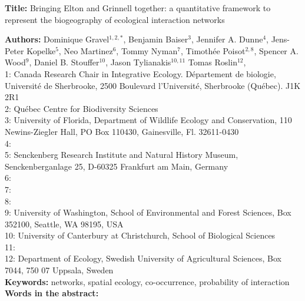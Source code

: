 \documentclass[12pt]{article}
\begin{document}
\linenumbers 
\modulolinenumbers[1]

\textbf{Title:} Bringing Elton and Grinnell together: a quantitative framework to represent the biogeography of ecological interaction networks

\textbf{Authors:} Dominique Gravel$^{1,2,*}$, Benjamin Baiser$^{3}$, Jennifer A. Dunne$^{4}$, Jens-Peter Kopelke$^{5}$, Neo
Martinez$^{6}$, Tommy Nyman$^{7}$, Timoth\'ee Poisot$^{2,8}$,  Spencer A. Wood$^{9}$, Daniel B. Stouffer$^{10}$, Jason Tylianakis$^{10,11}$ Tomas Roslin$^{12}$,\\

1: Canada Research Chair in Integrative Ecology. D\'epartement de
biologie, Universit\'e de Sherbrooke,  2500 Boulevard l'Universit\'e, 
Sherbrooke (Québec).  J1K 2R1\\

2: Qu\'ebec Centre for Biodiversity Sciences\\

3: University of Florida, Department of Wildlife Ecology and Conservation, 110 Newins-Ziegler Hall, PO Box 110430, Gainesville, Fl. 32611-0430 \\

4: \\

5: Senckenberg Research Institute and Natural History Museum, Senckenberganlage 25, D-60325 Frankfurt am Main, Germany\\

6:\\

7:\\

8:\\

9: University of Washington, School of Environmental and Forest Sciences, 
Box 352100, Seattle, WA 98195, USA\\

10: University of Canterbury at Christchurch, School of Biological Sciences\\

11:\\

12: Department of Ecology, Swedish University of Agricultural Sciences, Box 7044, 750 07 Uppsala, Sweden\\ 

\textbf{Keywords:} networks, spatial ecology, co-occurrence, probability of interaction\\

\textbf{Words in the abstract:} 
\end{document}
